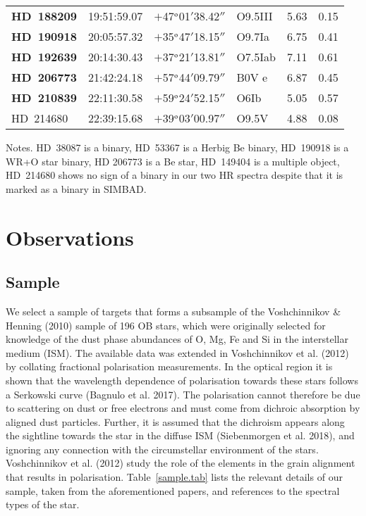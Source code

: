 \documentclass[tradiabstract]{aa} %
\begin{document}
\begin{table*} [h!tb]
\begin{center}
\begin{tabular}{llllcc}
{\bf HD~188209} &19:51:59.07 &$+$47$^{\rm o}$01$'$38.42$''$     & O9.5III &5.63 & 0.15 \\ 
{\bf HD~190918} &20:05:57.32 &$+$35$^{\rm o}$47$'$18.15$''$     & O9.7Ia &6.75  & 0.41 \\
{\bf HD~192639} &20:14:30.43 &$+$37$^{\rm o}$21$'$13.81$''$     & O7.5Iab &7.11 & 0.61  \\
{\bf HD~206773} &21:42:24.18 &$+$57$^{\rm o}$44$'$09.79$''$    & B0V{ e} &6.87     &0.45  \\
{\bf HD~210839} &22:11:30.58 &$+$59$^{\rm o}$24$'$52.15$''$     & O6Ib &5.05    & 0.57 \\
HD~214680 &22:39:15.68 &$+$39$^{\rm o}$03$'$00.97$''$   & O9.5V  &4.88  &0.08 \\
  \hline
\end{tabular}
\end{center}

{ Notes. HD~38087 is a binary, HD~53367 is a Herbig Be binary,
  HD~190918 is a WR+O star binary, HD 206773 is a Be star, HD~149404
  is a multiple object, HD~214680 shows no sign
  of a binary in our two HR spectra despite that it is marked as a binary in SIMBAD.}

\end{table*}




\section{Observations}

\subsection{Sample}
  
We select a sample of targets that forms a subsample of the
Voshchinnikov \& Henning (2010) sample of 196 OB stars, which were
originally selected for knowledge of the dust phase abundances of O,
Mg, Fe and Si in the interstellar medium (ISM). The available data was
extended in Voshchinnikov et al. (2012) by collating fractional
polarisation measurements. In the optical region it is shown that the
wavelength dependence of polarisation towards these stars follows a
Serkowski curve (Bagnulo et al. 2017). The polarisation cannot
therefore be due to scattering on dust or free electrons and { must
  come from} dichroic absorption { by} aligned dust
particles. Further, it is assumed that the dichroism appears along the
sightline towards the star in the diffuse ISM (Siebenmorgen et
al. 2018), and ignoring any connection with the circumstellar
environment of the stars. Voshchinnikov et al. (2012) study the role
of the elements in the grain alignment that results in polarisation.
Table~\ref{sample.tab} lists the relevant details of our sample, taken
from the aforementioned papers, and references to the spectral types
of the star.
\end{document}
